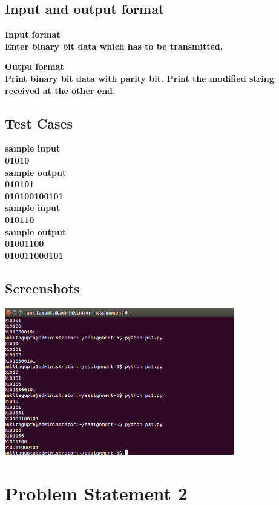 \documentclass[a4paper,10pt]{report}
\begin{document}
  \subsection{Input and output format}
\bf{\large{Input format}}\\

Enter binary bit data which has to be transmitted.

\bf{\large{Outpu format}}\\

Print binary bit data with parity bit.
Print the modified string received at the other end.

\newpage

\subsection{Test Cases}
\bf{sample input}\\
01010\\

\bf{sample output}\\
010101\\
010100100101\\

\bf{sample input}\\
010110\\

\bf{sample output}\\
01001100\\
010011000101\\



\subsection{Screenshots}
\includegraphics[width=100mm]{Screenshot from 2017-09-12 16:14:37.png}
\newpage

\section{Problem Statement 2}
\end{document}
